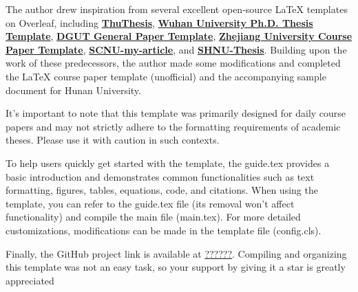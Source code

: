 \documentclass[
    report,     %
    oneside,    %
    UTF8,       %
    zihao=-4    %
]{config} %
\begin{document}

\begin{abstractEN}[0.6cm] %

The author drew inspiration from several excellent open-source \LaTeX{} templates on Overleaf, including 
\href{https://github.com/tuna/thuthesis}{\textbf{ThuThesis}}, \href{http://aff.whu.edu.cn/huangzh/}{\textbf{Wuhan University Ph.D. Thesis Template}}, 
\href{https://www.overleaf.com/latex/templates/dguttong-yong-lun-wen-slash-bao-gao-slash-zuo-ye-mo-ban-fei-guan-fang/gkymcyhwhjhj}{\textbf{DGUT General Paper Template}}, 
\href{https://www.overleaf.com/latex/templates/zhe-jiang-da-xue-ke-cheng-lun-wen-mo-ban/mjpzqvgsmdzn}{\textbf{Zhejiang University Course Paper Template}}, 
\href{https://www.overleaf.com/latex/templates/scnu-my-article/jkbbvhnddtsw}{\textbf{SCNU-my-article}}, and 
\href{https://www.overleaf.com/latex/templates/shnu-thesis/wsykzrksspgn}{\textbf{SHNU-Thesis}}. 
Building upon the work of these predecessors, the author made some modifications and completed the \LaTeX{} course paper template (unofficial) and the accompanying sample document for Hunan University.

It's important to note that this template was primarily designed for daily course papers and may not strictly adhere to the formatting requirements of academic theses. Please use it with caution in such contexts.

To help users quickly get started with the template, the guide.tex provides a basic introduction and demonstrates common functionalities such as text formatting, figures, tables, equations, code, and citations. When using the template, you can refer to the guide.tex file (its removal won't affect functionality) and compile the main file (main.tex). For more detailed customizations, modifications can be made in the template file (config.cls).

Finally, the GitHub project link is available at \url{??????}. Compiling and organizing this template was not an easy task, so your support by giving it a star is greatly appreciated~




\def\keywordsEN{keyword 1; keyword 2; keyword 3; keyword 4; keyword 5}

\end{abstractEN}


\end{document}
